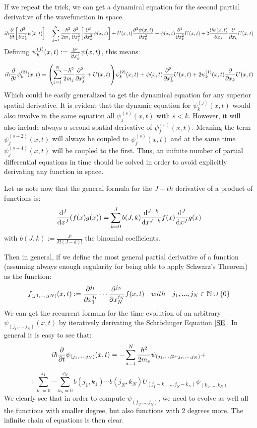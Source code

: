 \documentclass[11pt, a4paper]{article} %
\newcommand{\N}{\mathbb{N}}
\begin{document}
If we repeat the trick, we can get a dynamical equation for the second partial derivative of the wavefunction in space.
\begin{equation}
i\hbar \pdv{}{t}\qty[\pdv[2]{}{x_k}\psi(x,t)] = \sum_{j=1}^N\frac{-\hbar^2}{2m_j}\pdv[2]{}{x_j}\qty[\pdv[2]{}{x_k}\psi(x,t)]+U(x,t)\pdv[2]{\psi(x,t)}{x_k} + \psi(x,t)\pdv[2]{}{x_k}U(x,t)+2\pdv{\psi(x,t)}{x_k}\pdv{}{x_k}U(x,t)
\end{equation}
Defining $\psi^{(j)}_k(x,t):=\pdv[j]{}{x_k}\psi(x,t)$, this means:
\begin{equation}
i\hbar \pdv{}{t}\psi^{(2)}_k(x,t) = \qty(\sum_{j=1}^N\frac{-\hbar^2}{2m_j}\pdv[2]{}{x_j}+U(x,t))\psi^{(2)}_k(x,t)+ \psi(x,t)\pdv[2]{}{x_k}U(x,t)+2\psi^{(1)}_k(x,t)\pdv{}{x_k}U(x,t)
\end{equation}
Which could be easily generalized to get the dynamical equation for any superior spatial derivative. It is evident that the dynamic equation for $\psi^{(j)}_k(x,t)$ would also involve in the same equation all $\psi^{(s)}_j(x,t)$ with $s<k$. However, it will also include always a second spatial derivative of $\psi^{(s)}_j(x,t)$. Meaning the term $\psi^{(s+2)}_j(x,t)$ will always be coupled to $\psi^{(s)}_j(x,t)$ and at the same time $\psi^{(s+4)}_j(x,t)$ will be coupled to the first. Thus, an inifnite number of partial differential equations in time should be solved in order to avoid explicitly derivating any function in space. 

Let us note now that the general formula for the $J-th$ derivative of a product of functions is:
\begin{equation}
\dv[J]{}{x}\qty(f(x)g(x))=\sum_{k=0}^J b(J, k)\dv[J-k]{}{x}f(x)\dv[J]{}{x}g(x)
\end{equation}
with $b(J,k):=\frac{J!}{k!(J-k)!}$ the binomial coefficients.

Then in general, if we define the most general partial derivative of a function (assuming always enough regularity for being able to apply Schwarz's Theorem) as the function:
\begin{equation}\label{defPdv}
f_{(j1,...,jN)}(x,t):=\pdv[j_1]{}{x_1}\cdots\pdv[j_N]{}{x_N} f(x,t) \quad with\quad j_1,...,j_N\in \N\cup \{0\}
\end{equation}
We can get the recurrent formula for the time evolution of an arbitrary $\psi_{(j_1,...,j_N)}(x,t)$ by iteratively derivating the Schrödinger Equation \eqref{SE}. In general it is easy to see that:
\begin{equation}\label{infchain.SE}
i\hbar \pdv{}{t}\psi_{(j_1,...,j_N)}(x,t)=-\sum_{s=1}^N\frac{\hbar^2}{2m_s}\psi_{(j_1,...,2+j_s,...,j_N)}+
\end{equation}
$$
+\sum_{k_1=0}^{j_1}\cdots\sum_{k_N=0}^{j_N} b(j_1,k_1)\cdots b(j_N,k_N)U_{(j_1-k_1,...,j_N-k_N)}\psi_{(k_1,...,k_N)}
$$
We clearly see that in order to compute $\psi_{(j_1,...,j_N)}$, we need to evolve as well all the functions with smaller degree, but also functions with 2 degrees more. The infinite chain of equations is then clear.
\end{document}
